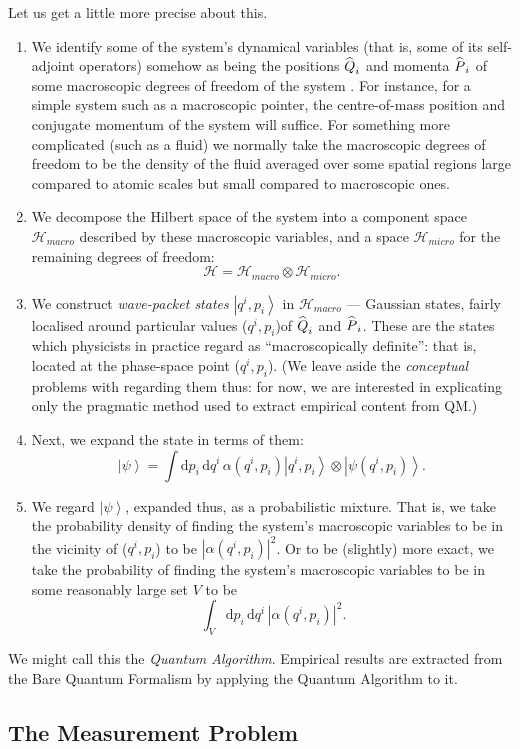 \documentclass[12pt]{article}
\newcommand{\be}{\begin{equation}}
\newcommand{\ee}{\end{equation}}
\newcommand{\dr}[1]{\ensuremath{\mathrm{d} #1\,}}
\newcommand{\mc}[1]{\ensuremath{\mathcal{#1}}}
\newcommand{\ket}[1]{\ensuremath{\left|  #1 \right\rangle}}
\newcommand{\tpk}[2]{\ensuremath{\ket{#1}\!\otimes\!\ket{#2}}}
\newcommand{\op}[1]{\ensuremath{\widehat{\textsf{\ensuremath{#1}}}}}
\begin{document}
Let us get a little more precise about this. 
\begin{enumerate}
\item We identify some of the system's dynamical variables (that is, some of its self-adjoint operators) somehow as being the positions $\op{Q}_i$ and momenta $\op{P}_i$ of some macroscopic degrees of freedom of the system . For instance, for a simple system such as a macroscopic pointer, the centre-of-mass position and conjugate momentum of the system will suffice. For something more complicated (such as a fluid) we normally take the macroscopic degrees of freedom to be the density of the fluid averaged over some spatial regions large compared to atomic scales but small compared to macroscopic ones.
\item We decompose the Hilbert space of the system into a component space $\mc{H}_{macro}$ described by these macroscopic variables, and a space $\mc{H}_{micro}$ for the remaining degrees of freedom:
\be \mc{H}=\mc{H}_{macro}\otimes \mc{H}_{micro}.\ee
\item We construct \emph{wave-packet states} \ket{q^i,p_i} in $\mc{H}_{macro}$ --- Gaussian states, fairly localised around particular values ($q^i,p_i$)of $\op{Q}_i$ and $\op{P}_i$. These are the states which physicists in practice regard as ``macroscopically definite'': that is, located at the phase-space point ($q^i,p_i$). (We leave aside the \emph{conceptual } problems with regarding them thus: for now, we are interested in explicating only the pragmatic method used to extract empirical content from QM.)
\item Next, we expand the state in terms of them:
\be \ket{\psi}=\int \dr{p_i} \dr{q^i} \alpha(q^i,p_i)\tpk{q^i,p_i}{\psi(q^i,p_i)}.\ee
\item We regard \ket{\psi}, expanded thus, as a probabilistic mixture. That is, we take the probability density of finding the system's macroscopic variables to be in the vicinity of ($q^i,p_i$) to be $|\alpha(q^i,p_i)|^2$. Or to be (slightly) more exact, we take the probability of finding the system's macroscopic variables to be  in some reasonably large set $V$ to be
\be \  \int_V \dr{p_i} \dr{q^i} |\alpha(q^i,p_i)|^2.\ee 
\end{enumerate}
We might call this the \emph{Quantum Algorithm}. Empirical results are extracted from the Bare Quantum Formalism by applying the Quantum Algorithm to it.

 
 \subsection{The Measurement Problem}\label{DMWWinterpretation}
\end{document}

